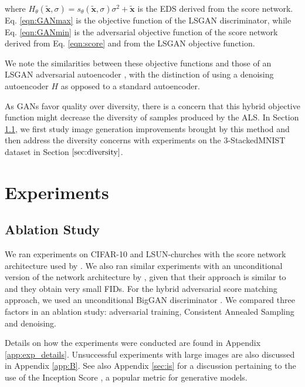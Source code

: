 \documentclass{article} \usepackage{iclr2021_conference_notitle,times}
\theoremstyle{definition}
\theoremstyle{definition}
\begin{document}
where $H_{\theta}(\boldsymbol{\tilde{x}},\sigma) = s_{\theta}(\boldsymbol{\tilde{x}},\sigma) \sigma^2 + \boldsymbol{\tilde{x}}$ is the EDS derived from the score network.
Eq. \ref{eqn:GANmax} is the objective function of the LSGAN discriminator, while Eq. \ref{eqn:GANmin} is the adversarial objective function of the score network derived from Eq. \ref{eqn:score} and from the LSGAN objective function.

We note the similarities between these objective functions and those of an LSGAN adversarial autoencoder \citep{makhzani2015adversarial, tolstikhin2017wasserstein, tran2018dist}, with the distinction of using a denoising autoencoder $H$ as opposed to a standard autoencoder. 

As GANs favor quality over diversity, there is a concern that this hybrid objective function might decrease the diversity of samples produced by the ALS. In Section \ref{sec:quality}, we first study image generation improvements brought by this method and then address the diversity concerns with experiments on the 3-StackedMNIST \citep{metz2016unrolled} dataset in Section $\ref{sec:diversity}$.


\section{Experiments}\label{sec:experiments}

\subsection{Ablation Study}\label{sec:quality}

We ran experiments on CIFAR-10 
\citep{krizhevsky2009learning} and LSUN-churches 
\citep{yu2015lsun} with the score network architecture used by \citet{song2020improved}. We also ran similar experiments with an unconditional version of the network architecture by \citet{ho2020denoising}, given that their approach is similar to \citet{song2019generative} and they obtain very small FIDs.
For the hybrid adversarial score matching approach, we used an unconditional BigGAN discriminator \citep{brock2018large}.
We compared three factors in an ablation study: adversarial training, Consistent Annealed Sampling and denoising.

Details on how the experiments were conducted are found in Appendix \ref{app:exp_details}. Unsuccessful experiments with large images are also discussed in Appendix \ref{app:B}. See also Appendix \ref{sec:is} for a discussion pertaining to the use of the Inception Score \citep{heusel2017gans}, a popular metric for generative models.
\end{document}
